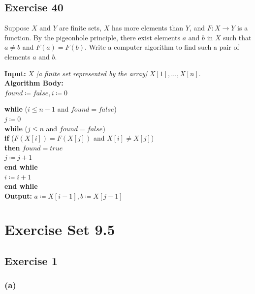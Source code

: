 \documentclass[14pt]{extarticle}
\begin{document}
\subsection{Exercise 40}
Suppose \(X\) and \(Y\) are finite sets, \(X\) has more elements than \(Y\), and \(F: X \to Y\) is a function. By 
the pigeonhole principle, there exist elements \(a\) and \(b\) in \(X\) such that \(a \neq b\) and \(F(a) = F(b)\). 
Write a computer algorithm to find such a pair of elements \(a\) and \(b\).

\begin{tcolorbox}[colframe=cyan]
{\bf Input:} \(X\) {\it [a finite set represented by the array]} \(X[1], \ldots, X[n]\). \\
{\bf Algorithm Body:} \\
\(found \coloneqq false, i \coloneqq 0\)
\end{tcolorbox}
\begin{tcolorbox}[colframe=cyan]
\begin{tabbing}
{\bf wh}\={\bf ile} (\(i \leq n-1\) and \(found = false\)) \\
        \> \(j \coloneqq 0\) \\
        \> {\bf wh}\={\bf ile} (\(j \leq n\) and \(found = false\))\\
        \>         \> {\bf if} (\(F(X[i]) = F(X[j])\) and \(X[i] \neq X[j]\)) \\
        \>         \> {\bf then} \(found = true\) \\
        \>         \> \(j \coloneqq j+1\) \\
        \> {\bf end while} \\
        \> \(i \coloneqq i+1\) \\
{\bf end while} \\
{\bf Output:} \(a \coloneqq X[i-1], b \coloneqq X[j-1]\) 
\end{tabbing}
\end{tcolorbox}

\section{Exercise Set 9.5}

\subsection{Exercise 1}

\subsubsection{(a)}
\end{document}
